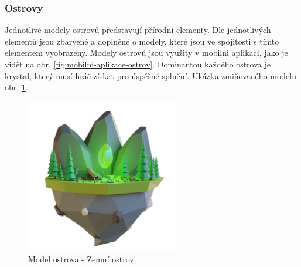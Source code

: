 \subsubsection{Ostrovy}
Jednotlivé modely ostrovů představují přírodní elementy. Dle jednotlivých elementů jsou zbarvené a doplněné o modely, které jsou ve spojitosti s tímto elementem vyobrazeny. Modely ostrovů jsou využity v mobilni aplikaci, jako je vidět na obr. \ref{fig:mobilni-aplikace-ostrov}. Dominantou každého ostrova je krystal, který musí hráč získat pro úspěšné splnění. Ukázka zmiňovaného modelu obr. \ref{fig:nature-island}.

\begin{figure}[h]
    \centering
    \includegraphics[width=0.6\textwidth]{img/NatureIsland.png}
    \caption{Model ostrova - Zemní ostrov.}
    \label{fig:nature-island}
\end{figure}

